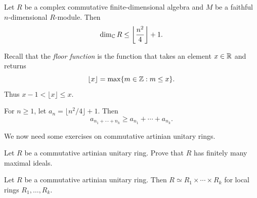 \begin{theorem}[Gustafson]
\label{thm:Gustafson}
    Let $R$ be a complex commutative finite-dimensional algebra 
    and $M$ be a faithful $n$-dimensional $R$-module. Then
    \[
    \dim_{\mathbb{C}}R\leq\left\lfloor\frac{n^2}{4}\right\rfloor+1.
    \]
\end{theorem}

Recall that the \emph{floor function} is the function that takes an element $x\in\mathbb{R}$ 
and returns 
\[
    \lfloor x\rfloor = \max\{m\in\mathbb{Z}:m\leq x\}.
\]
Thus $x-1<\lfloor x\rfloor\leq x$. 

\begin{exercise}
    \label{xca:floor}
    For $n\geq1$, let $a_n=\lfloor n^2/4\rfloor+1$. Then 
    \[
    a_{n_1+\cdots+n_k}\geq a_{n_1}+\cdots+a_{n_k}.
    \]
\end{exercise}


We now need some exercises on commutative artinian 
unitary rings.

\begin{exercise}
    Let $R$ be a commutative artinian unitary ring. 
    Prove that $R$ has finitely many maximal ideals. 
\end{exercise}


\begin{lemma}
\label{lem:artinian_local}
    Let $R$ be a commutative artinian unitary ring. Then 
    $R\simeq R_1\times\cdots\times R_k$ for local rings $R_1,\dots,R_k$. 
\end{lemma}


